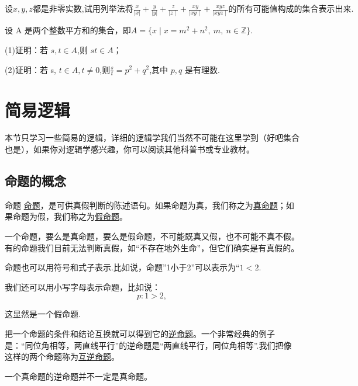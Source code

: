 \documentclass[lang=cn,math=cm,chinesefont=nofont,11pt,scheme=chinese,onecol]{elegantbook}
\begin{document}
\begin{exercise}\label{exer:17}
  $\text{设}x,y,z\text{都是非零实数,试用列举法将}\frac x{|x|}+\frac y{|y|}+{\frac{z}{\mid z\mid}}+{\frac{xy}{\mid xy\mid}}+{\frac{xyz}{\mid xyz\mid}}\text{的所有可能值构成的集合表示出来}.$
\end{exercise}

\begin{exercise}\label{exer:18}
  设 A 是两个整数平方和的集合，即$A=\{x\mid x=m^2+n^2,\:m,\:n\in\mathbb{Z}\}.$

(1)证明：若 $s,t{\in}A$,则 $st{\in}A$；

(2)证明：若 s, $t\in A,t\neq0$,则$\frac st=p^2+q^2$,其中 $p,q$ 是有理数.
\end{exercise}

\section{简易逻辑}
本节只学习一些简易的逻辑，详细的逻辑学我们当然不可能在这里学到（好吧集合也是），如果你对逻辑学感兴趣，你可以阅读其他科普书或专业教材。

\subsection{命题的概念}

\begin{definition}{命题}
  \underline{命题}，是可供真假判断的陈述语句。如果命题为真，我们称之为\underline{真命题}；如果命题为假，我们称之为\underline{假命题}。
\end{definition}

\begin{remark}
  一个命题，要么是真命题，要么是假命题，不可能既真又假，也不可能不真不假。有的命题我们目前无法判断真假，如“不存在地外生命”，但它们确实是有真假的。
\end{remark}

命题也可以用符号和式子表示.比如说，命题”1小于2”可以表示为“$1<2$.

我们还可以用小写字母表示命题，比如说：$$p:1>2,$$

这显然是一个假命题.

\hspace*{\fill}

把一个命题的条件和结论互换就可以得到它的\underline{逆命题}。一个非常经典的例子是：“同位角相等，两直线平行”的逆命题是“两直线平行，同位角相等”.我们把像这样的两个命题称为\underline{互逆命题}。

\begin{remark}
  一个真命题的逆命题并不一定是真命题。
\end{remark}
\end{document}

